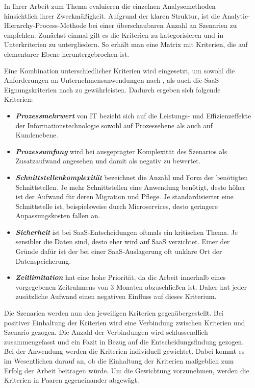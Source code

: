 In Ihrer Arbeit zum Thema  evaluieren \citeauthor{Velasquez.2013} die einzelnen Analysemethoden hinsichtlich ihrer Zweckmäßigkeit. Aufgrund der klaren Struktur, ist die Analytic-Hierarchy-Process-Methode bei einer überschaubaren Anzahl an Szenarien zu empfehlen. Zunächst einmal gilt es die Kriterien zu kategorisieren und in Unterkriterien zu untergliedern. So erhält man eine Matrix mit Kriterien, die auf elementarer Ebene heruntergebrochen ist. 

Eine Kombination unterschiedlicher Kriterien wird eingesetzt, um sowohl die Anforderungen an Unternehmensanwendungen nach \citeauthor{Balzert.2011}, als auch die \ac{SaaS}-Eignungskriterien nach \citeauthor{Klein.2010} zu gewährleisten. Dadurch ergeben sich folgende Kriterien:

\begin{itemize}
    \item \textit{\textbf{Prozessmehrwert}}
    von \ac{IT} bezieht sich auf die Leistungs- und Effizienzeffekte der Informationstechnologie sowohl auf Prozessebene als auch auf Kundenebene.
    \item \textit{\textbf{Prozessumfang}}
    wird bei ausgeprägter Komplexität des Szenarios als Zusatzaufwand angesehen und damit als negativ zu bewertet.
    
    \item \textit{\textbf{Schnittstellenkomplexität}}
    bezeichnet die Anzahl und Form der benötigten Schnittstellen. Je mehr Schnittstellen eine Anwendung benötigt, desto höher ist der Aufwand für deren Migration und Pflege. Je standardisierter eine Schnittstelle ist, beispielsweise durch Microservices, desto geringere Anpassungskosten fallen an. 
    
    \item \textit{\textbf{Sicherheit}}
    ist bei \ac{SaaS}-Entscheidungen oftmals ein kritischen Thema. Je sensibler die Daten sind, desto eher wird auf \ac{SaaS} verzichtet. Einer der Gründe dafür ist der bei einer \ac{SaaS}-Auslagerung oft unklare Ort der Datenspeicherung.
    
    \item \textit{\textbf{Zeitlimitation}}
    hat eine hohe Priorität, da die Arbeit innerhalb eines vorgegebenen Zeitrahmens von 3 Monaten abzuschließen ist. Daher hat jeder zusätzliche Aufwand einen negativen Einfluss auf dieses Kriterium. 
    \autocite{Balzert.2011}
    \autocite{Klein.2010}
\end{itemize}

Die Szenarien werden nun den jeweiligen Kriterien gegenübergestellt. Bei positiver Einhaltung der Kriterien wird eine Verbindung zwischen Kriterien und Szenario gezogen. Die Anzahl der Verbindungen wird schlussendlich zusammengefasst und ein Fazit in Bezug auf die Entscheidungsfindung gezogen. Bei der Anwendung werden die Kriterien individuell gewichtet. Dabei kommt es im Wesentlichen darauf an, ob die Einhaltung der Kriterien maßgeblich zum Erfolg der Arbeit beitragen würde. Um die Gewichtung vorzunehmen, werden die Kriterien in Paaren gegeneinander abgewägt. 

